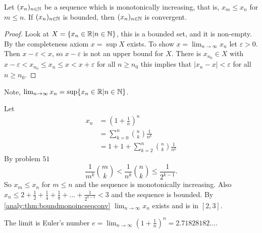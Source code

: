 \documentclass[10pt, a4paper]{article}
\newcommand{\seq}[1][x]{(#1_n)_{n \in \N}}
\begin{document}
\begin{theorem}\label{analy:thm:boundmonoincseqconv}
    Let $\seq$ be a sequence which is monotonically increasing,
    that is,
    $x_m \leq x_n$ for $m \leq n$.
    If $\seq$ is bounded,
    then $\seq$ is convergent.
    \begin{proof}
        Look at $X = \{x_n \in \mathbb{R} | n \in \mathbb{N}\}$,
        this is a bounded set,
        and it is non-empty.
        By the completeness axiom $x = \sup X$ exists.
        To show $x = \lim_{n \rightarrow \infty}x_n$
        let $\varepsilon > 0$.
        Then $x - \varepsilon < x$,
        so $x - \varepsilon$ is not an upper bound for $X$.
        There is $x_{n_0} \in X$ with
        $x - \varepsilon < x_{n_0} \leq x_n \leq x < x + \varepsilon$ for all $n \geq n_0$
        this implies that
        $|x_n - x| < \varepsilon$ for all $n \geq n_0$.
    \end{proof}
\end{theorem}
Note, $\lim_{n \rightarrow \infty}x_n = \sup\{x_n \in \mathbb{R} | n \in \mathbb{N}\}$.
\begin{example}
    Let
    \begin{align*}
        x_n &= \left(1 + \frac{1}{n}\right) ^ n \\
        &= \sum_{k = 0}^{n}\binom{n}{k}\frac{1}{n ^ k} \\
        &= 1 + 1 + \sum_{k = 2}^{n}\binom{n}{k}\frac{1}{n ^ k}
    \end{align*}
    By problem $51$
    \[
    \frac{1}{m ^ k}\binom{m}{k} < \frac{1}{n ^ k}\binom{n}{k} \leq \frac{1}{2 ^ {k - 1}}.
    \]
    So $x_m \leq x_n$ for $m \leq n$ and the sequence is monotonically increasing.
    Also $x_n \leq 2 + \frac{1}{2} + \frac{1}{4} + \frac{1}{8} + \dotsc + \frac{1}{2 ^ {n - 1}} < 3$
    and the sequence is bounded.
    By \autoref{analy:thm:boundmonoincseqconv} $\lim_{n \rightarrow \infty}x_n$ exists and is in $[2, 3]$.
    
    The limit is Euler's number $e = \displaystyle\lim_{n \rightarrow \infty}\left(1 + \frac{1}{n}\right) ^ n = 2.71828182\dotsc$.
\end{example}
\end{document}
